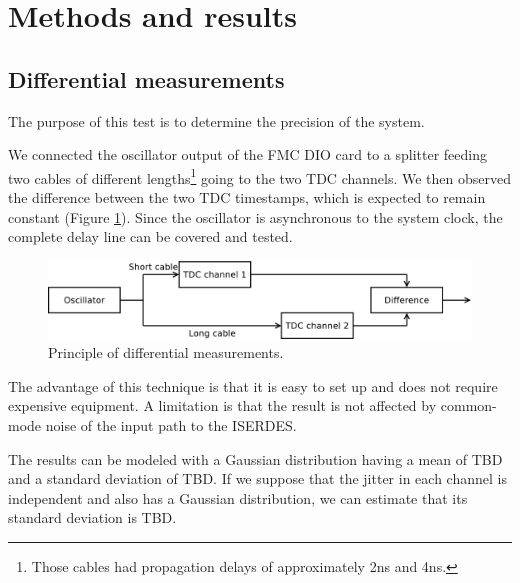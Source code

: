 \documentclass[a4paper,11pt]{article}
\begin{document}
\section{Methods and results}

\subsection{Differential measurements}
The purpose of this test is to determine the precision of the system.

We connected the oscillator output of the FMC DIO card to a splitter feeding two cables of different lengths\footnote{Those cables had propagation delays of approximately 2ns and 4ns.} going to the two TDC channels. We then observed the difference between the two TDC timestamps, which is expected to remain constant (Figure \ref{fig:dtdc}). Since the oscillator is asynchronous to the system clock, the complete delay line can be covered and tested.

\begin{figure}[H]
\includegraphics[width=\textwidth]{dtdc.pdf}
\caption{Principle of differential measurements.}
\label{fig:dtdc}
\end{figure}

The advantage of this technique is that it is easy to set up and does not require expensive equipment. A limitation is that the result is not affected by common-mode noise of the input path to the ISERDES.



The results can be modeled with a Gaussian distribution having a mean of TBD and a standard deviation of TBD. If we suppose that the jitter in each channel is independent and also has a Gaussian distribution, we can estimate that its standard deviation is TBD.
\end{document}
